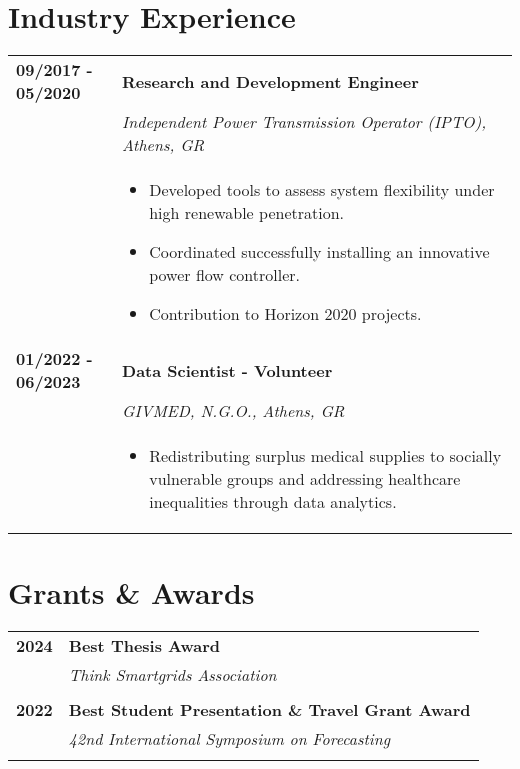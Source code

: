 \documentclass[11pt,a4paper]{article}
\makeatletter
\newlength{\datecolwidth}
\newenvironment{entrylist}{%
  \begin{longtable}{@{}p{\datecolwidth}@{\hspace{0.8em}}p{\dimexpr\linewidth-\datecolwidth-0.8em\relax}@{}}%
}{\end{longtable}}
\newcommand{\entry}[4]{%
  \textbf{#1} & \textbf{#2}\\[-0.2em]
              & {\itshape #3}\\[-0.2em]
              & #4\\[0.8em]
}
\makeatother
\begin{document}

\section*{Industry Experience}
\begin{entrylist}
  \entry{09/2017 - 05/2020}{Research and Development Engineer}{Independent Power Transmission Operator (IPTO), Athens, GR}{
    \begin{itemize}
      \vspace{-0.4em}
      \item Developed tools to assess system flexibility under high renewable penetration.
      \item Coordinated successfully installing an innovative power flow controller.
      \item Contribution to Horizon 2020 projects.
    \end{itemize}
  }
  \entry{01/2022 - 06/2023}{Data Scientist - Volunteer}{GIVMED, N.G.O., Athens, GR}{
    \begin{itemize}
      \vspace{-0.4em}
      \item Redistributing surplus medical supplies to socially vulnerable groups and addressing healthcare inequalities through data analytics.
    \end{itemize}  }

\end{entrylist}

\section*{Grants \& Awards}
\begin{entrylist}
  \entry{2024}{Best Thesis Award}{Think Smartgrids Association}{}
  \entry{2022}{Best Student Presentation \& Travel Grant Award}{42nd International Symposium on Forecasting}{}
\end{entrylist}
\end{document}
